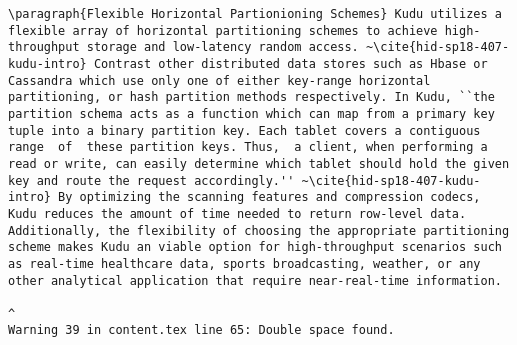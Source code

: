 \begin{tiny}
\begin{verbatim}
\paragraph{Flexible Horizontal Partionioning Schemes} Kudu utilizes a flexible array of horizontal partitioning schemes to achieve high-throughput storage and low-latency random access. ~\cite{hid-sp18-407-kudu-intro} Contrast other distributed data stores such as Hbase or Cassandra which use only one of either key-range horizontal partitioning, or hash partition methods respectively. In Kudu, ``the partition schema acts as a function which can map from a primary key tuple into a binary partition key. Each tablet covers a contiguous  range  of  these partition keys. Thus,  a client, when performing a read or write, can easily determine which tablet should hold the given key and route the request accordingly.'' ~\cite{hid-sp18-407-kudu-intro} By optimizing the scanning features and compression codecs, Kudu reduces the amount of time needed to return row-level data. Additionally, the flexibility of choosing the appropriate partitioning scheme makes Kudu an viable option for high-throughput scenarios such as real-time healthcare data, sports broadcasting, weather, or any other analytical application that require near-real-time information.  
                                                                                                                                                                                                                                                                                                                                                                                                                                                                                                                                                                                                                                                                                                                                               ^
Warning 39 in content.tex line 65: Double space found.

\end{verbatim}
\end{tiny}
